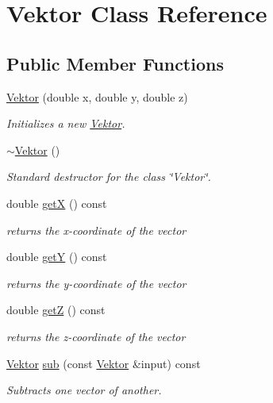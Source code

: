 \hypertarget{class_vektor}{}\section{Vektor Class Reference}
\label{class_vektor}
\subsection*{Public Member Functions}
\begin{DoxyCompactItemize}
\item 
\hyperlink{class_vektor_a744b4980d331af082c08890ff2e4a857}{Vektor} (double x, double y, double z)
\begin{DoxyCompactList}\small\item\em Initializes a new \hyperlink{class_vektor}{Vektor}. \end{DoxyCompactList}\item 
\hyperlink{class_vektor_a66e8e932c4e2df23b5a1d4c4764ce9d2}{$\sim$\+Vektor} ()
\begin{DoxyCompactList}\small\item\em Standard destructor for the class \char`\"{}\+Vektor\char`\"{}. \end{DoxyCompactList}\item 
double \hyperlink{class_vektor_ad1864a78b96956dc7f504bba9b39af45}{getX} () const
\begin{DoxyCompactList}\small\item\em returns the x-\/coordinate of the vector \end{DoxyCompactList}\item 
double \hyperlink{class_vektor_a93d6584667064c7e3abc9d42b529db93}{getY} () const
\begin{DoxyCompactList}\small\item\em returns the y-\/coordinate of the vector \end{DoxyCompactList}\item 
double \hyperlink{class_vektor_aaef4681c5b2ce1348685eb4cd89bd9b2}{getZ} () const
\begin{DoxyCompactList}\small\item\em returns the z-\/coordinate of the vector \end{DoxyCompactList}\item 
\hyperlink{class_vektor}{Vektor} \hyperlink{class_vektor_a9e095d5d627ad26c7c2d6f227567e731}{sub} (const \hyperlink{class_vektor}{Vektor} \&input) const
\begin{DoxyCompactList}\small\item\em Subtracts one vector of another. \end{DoxyCompactList}\item 

\end{DoxyCompactItemize}
